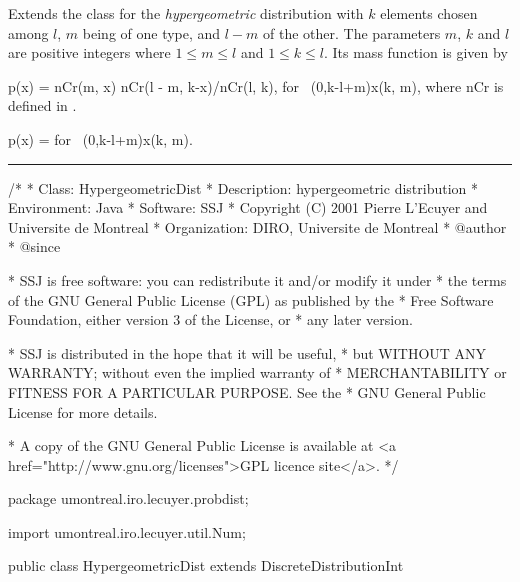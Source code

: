 
Extends the class  for
the {\em hypergeometric\/} distribution \cite[page 101]{rGEN98a} with
$k$ elements chosen among $l$, $m$ being
of one type, and $l-m$ of the other.
The parameters $m$, $k$ and $l$ are positive integers
where $1\le m\le l$ and $1\le k\le l$.
Its mass function is given by
\begin{htmlonly}
\eq
    p(x) =
            \mbox{nCr}(m, x) \mbox{nCr}(l - m, k-x)/\mbox{nCr}(l, k),
 \qquad \mbox{for } \max(0,k-l+m)\le x\le \min(k, m),
\endeq
where nCr is defined in .
\end{htmlonly}
\begin{latexonly}
\eq
    p(x) =
 \qquad \mbox{for } \max(0,k-l+m)\le x\le \min(k, m).  
\endeq
\end{latexonly}


\bigskip\hrule

\begin{code}
\begin{hide}
/*
 * Class:        HypergeometricDist
 * Description:  hypergeometric distribution
 * Environment:  Java
 * Software:     SSJ
 * Copyright (C) 2001  Pierre L'Ecuyer and Universite de Montreal
 * Organization: DIRO, Universite de Montreal
 * @author
 * @since

 * SSJ is free software: you can redistribute it and/or modify it under
 * the terms of the GNU General Public License (GPL) as published by the
 * Free Software Foundation, either version 3 of the License, or
 * any later version.

 * SSJ is distributed in the hope that it will be useful,
 * but WITHOUT ANY WARRANTY; without even the implied warranty of
 * MERCHANTABILITY or FITNESS FOR A PARTICULAR PURPOSE.  See the
 * GNU General Public License for more details.

 * A copy of the GNU General Public License is available at
   <a href="http://www.gnu.org/licenses">GPL licence site</a>.
 */
\end{hide}
package umontreal.iro.lecuyer.probdist;\begin{hide}
import umontreal.iro.lecuyer.util.Num;
\end{hide}

public class HypergeometricDist extends DiscreteDistributionInt\begin{hide} {

   private int m;
   private int l;
   private int k;
   private double p0;
\end{hide}\end{code}

